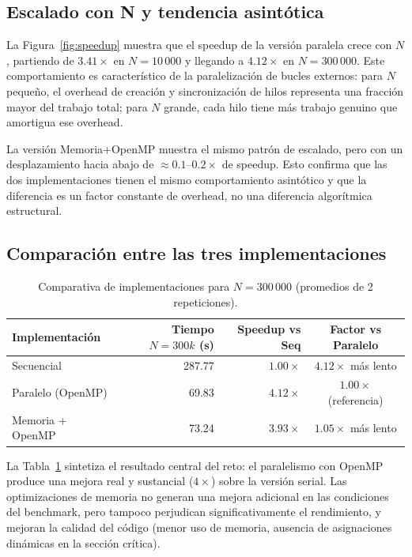 \documentclass{article}
\begin{document}
\subsection{Escalado con N y tendencia asint\'otica}

La Figura~\ref{fig:speedup} muestra que el speedup de la versi\'on paralela crece con $N$,
partiendo de $3.41\times$ en $N=10\,000$ y llegando a $4.12\times$ en $N=300\,000$. Este
comportamiento es caracter\'istico de la paralelizaci\'on de bucles externos: para $N$
peque\~no, el overhead de creaci\'on y sincronizaci\'on de hilos representa una fracci\'on
mayor del trabajo total; para $N$ grande, cada hilo tiene m\'as trabajo genuino que
amortigua ese overhead.

La versi\'on Memoria+OpenMP muestra el mismo patr\'on de escalado, pero con un
desplazamiento hacia abajo de $\approx 0.1$--$0.2\times$ de speedup. Esto confirma que
las dos implementaciones tienen el mismo comportamiento asint\'otico y que la diferencia es
un factor constante de overhead, no una diferencia algorítmica estructural.

\subsection{Comparaci\'on entre las tres implementaciones}

\begin{table}[H]
\centering
\begin{tabular}{lrrc}
\toprule
\textbf{Implementaci\'on} & \textbf{Tiempo $N=300k$ (s)} & \textbf{Speedup vs Seq}
& \textbf{Factor vs Paralelo} \\
\midrule
Secuencial          & 287.77 & $1.00\times$ & $4.12\times$ m\'as lento \\
Paralelo (OpenMP)   &  69.83 & $4.12\times$ & $1.00\times$ (referencia) \\
Memoria + OpenMP    &  73.24 & $3.93\times$ & $1.05\times$ m\'as lento \\
\bottomrule
\end{tabular}
\caption{Comparativa de implementaciones para $N=300\,000$ (promedios de 2 repeticiones).}
\label{tab:comparativa}
\end{table}

La Tabla~\ref{tab:comparativa} sintetiza el resultado central del reto: el paralelismo con
OpenMP produce una mejora real y sustancial ($4\times$) sobre la versi\'on serial. Las
optimizaciones de memoria no generan una mejora adicional en las condiciones del benchmark,
pero tampoco perjudican significativamente el rendimiento, y mejoran la calidad del c\'odigo
(menor uso de memoria, ausencia de asignaciones din\'amicas en la secci\'on cr\'itica).
\end{document}
